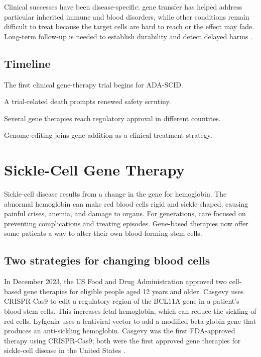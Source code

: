 \documentclass[12pt,oneside]{book}
\begin{document}
Clinical successes have been disease-specific: gene transfer has helped
address particular inherited immune and blood disorders, while other
conditions remain difficult to treat because the target cells are hard to
reach or the effect may fade. Long-term follow-up is needed to establish
durability and detect delayed harms
\cite{geneTherapyHistory,adaGeneTherapyTrial}.

\section*{Timeline}
\begin{description}[leftmargin=2.3cm,style=nextline]
  \item[1990] The first clinical gene-therapy trial begins for ADA-SCID.
  \item[1999] A trial-related death prompts renewed safety scrutiny.
  \item[2010s] Several gene therapies reach regulatory approval in different countries.
  \item[2020s] Genome editing joins gene addition as a clinical treatment strategy.
\end{description}
\chapter[Sickle-Cell Gene Therapy]{Sickle-Cell Gene Therapy}

Sickle-cell disease results from a change in the gene for hemoglobin. The
abnormal hemoglobin can make red blood cells rigid and sickle-shaped, causing
painful crises, anemia, and damage to organs. For generations, care focused
on preventing complications and treating episodes. Gene-based therapies now
offer some patients a way to alter their own blood-forming stem cells.

\section{Two strategies for changing blood cells}
In December 2023, the US Food and Drug Administration approved two cell-based
gene therapies for eligible people aged 12 years and older. Casgevy uses
CRISPR-Cas9 to edit a regulatory region of the BCL11A gene in a patient's
blood stem cells. This increases fetal hemoglobin, which can reduce the
sickling of red cells. Lyfgenia uses a lentiviral vector to add a modified
beta-globin gene that produces an anti-sickling hemoglobin. Casgevy was the
first FDA-approved therapy using CRISPR-Cas9; both were the first approved
gene therapies for sickle-cell disease in the United States
\cite{fdaSickleGeneTherapy,fdaCasgevyReview}.
\end{document}
